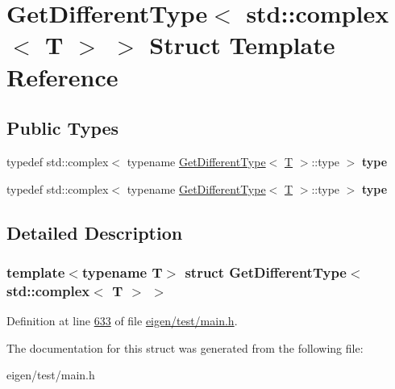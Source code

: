 \hypertarget{struct_get_different_type_3_01std_1_1complex_3_01_t_01_4_01_4}{}\section{Get\+Different\+Type$<$ std\+:\+:complex$<$ T $>$ $>$ Struct Template Reference}
\label{struct_get_different_type_3_01std_1_1complex_3_01_t_01_4_01_4}
\subsection*{Public Types}
\begin{DoxyCompactItemize}
\item 
\mbox{\label{struct_get_different_type_3_01std_1_1complex_3_01_t_01_4_01_4_a9d236dcb7ecac93ac7cc1403cd16ea1f}} 
typedef std\+::complex$<$ typename \hyperlink{struct_get_different_type}{Get\+Different\+Type}$<$ \hyperlink{group___sparse_core___module}{T} $>$\+::type $>$ {\bfseries type}
\item 
\mbox{\label{struct_get_different_type_3_01std_1_1complex_3_01_t_01_4_01_4_a9d236dcb7ecac93ac7cc1403cd16ea1f}} 
typedef std\+::complex$<$ typename \hyperlink{struct_get_different_type}{Get\+Different\+Type}$<$ \hyperlink{group___sparse_core___module}{T} $>$\+::type $>$ {\bfseries type}
\end{DoxyCompactItemize}


\subsection{Detailed Description}
\subsubsection*{template$<$typename T$>$\newline
struct Get\+Different\+Type$<$ std\+::complex$<$ T $>$ $>$}



Definition at line \hyperlink{eigen_2test_2main_8h_source_l00633}{633} of file \hyperlink{eigen_2test_2main_8h_source}{eigen/test/main.\+h}.



The documentation for this struct was generated from the following file\+:\begin{DoxyCompactItemize}
\item 
eigen/test/main.\+h\end{DoxyCompactItemize}
